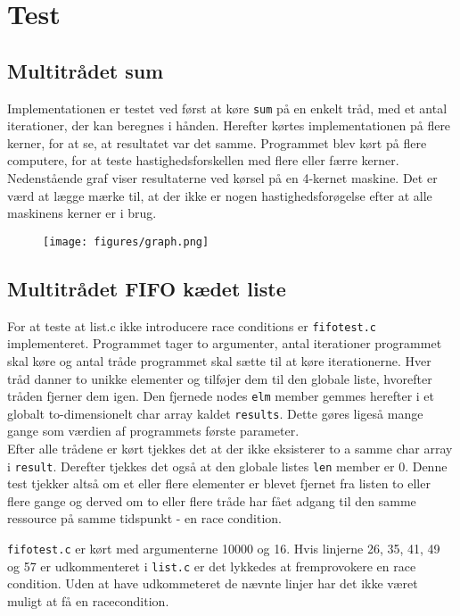 \section{Test}

\subsection{Multitrådet sum}
Implementationen er testet ved først at køre \texttt{sum} på en enkelt tråd, med et antal iterationer, der kan beregnes i hånden.
Herefter kørtes implementationen på flere kerner, for at se, at resultatet var det samme. 
Programmet blev kørt på flere computere, for at teste hastighedsforskellen med flere eller færre kerner. 
Nedenstående graf viser resultaterne ved kørsel på en 4-kernet maskine. Det er værd at lægge mærke til, at der ikke er nogen hastighedsforøgelse efter at alle maskinens kerner er i brug. 

\begin{figure}[h!]
\center
\texttt{[image: figures/graph.png]}
\end{figure}

\subsection{Multitrådet FIFO kædet liste}
For at teste at list.c ikke introducere race conditions er \texttt{fifotest.c} implementeret. Programmet tager to argumenter, antal iterationer programmet skal køre og antal tråde programmet skal sætte til at køre iterationerne. Hver tråd danner to unikke elementer og tilføjer dem til den globale liste, hvorefter tråden fjerner dem igen. Den fjernede nodes \texttt{elm} member gemmes herefter i et globalt to-dimensionelt char array kaldet \texttt{results}. Dette gøres ligeså mange gange som værdien af programmets første parameter. \\

Efter alle trådene er kørt tjekkes det at der ikke eksisterer to a samme char array i \texttt{result}. Derefter tjekkes det også at den globale listes \texttt{len} member er 0. Denne test tjekker altså om et eller flere elementer er blevet fjernet fra listen to eller flere gange og derved om to eller flere tråde har fået adgang til den samme ressource på samme tidspunkt - en race condition.

\texttt{fifotest.c} er kørt med argumenterne 10000 og 16. Hvis linjerne 26, 35, 41, 49 og 57 er udkommenteret i \texttt{list.c} er det lykkedes at fremprovokere en race condition. Uden at have udkommeteret de nævnte linjer har det ikke været muligt at få en racecondition.

